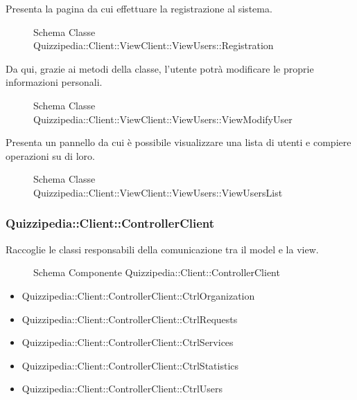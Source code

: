 Presenta la pagina da cui effettuare la  registrazione al sistema.
\begin{figure}[H]
\centering
\noindent{}
\caption{Schema Classe Quizzipedia::Client::ViewClient::ViewUsers::Registration}
\end{figure}
Da qui, grazie ai metodi della classe, l'utente potrà modificare le proprie informazioni personali.
\begin{figure}[H]
\centering
\noindent{}
\caption{Schema Classe Quizzipedia::Client::ViewClient::ViewUsers::ViewModifyUser}
\end{figure}
Presenta un pannello da cui è possibile visualizzare una lista di utenti e compiere operazioni su di loro.
\begin{figure}[H]
\centering
\noindent{}
\caption{Schema Classe Quizzipedia::Client::ViewClient::ViewUsers::ViewUsersList}
\end{figure}
\subsubsection{Quizzipedia::Client::ControllerClient}
Raccoglie le classi responsabili della comunicazione tra il model e la view.
\begin{figure}[H]
\centering
\noindent{}
\caption{Schema Componente Quizzipedia::Client::ControllerClient}
\end{figure}
\begin{itemize}
\item Quizzipedia::Client::ControllerClient::CtrlOrganization
\item Quizzipedia::Client::ControllerClient::CtrlRequests
\item Quizzipedia::Client::ControllerClient::CtrlServices
\item Quizzipedia::Client::ControllerClient::CtrlStatistics
\item Quizzipedia::Client::ControllerClient::CtrlUsers
\end{itemize}
